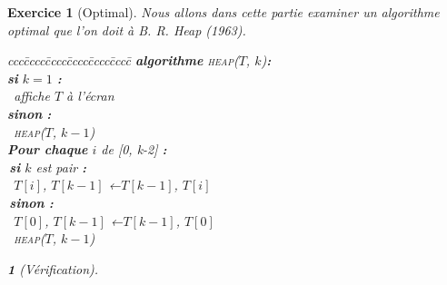 \documentclass{article}
\theoremstyle{exostyle}
\newtheorem{exo}{Exercice}
\theoremstyle{partiestyle}
\newtheorem{partie}{}[exo]
\theoremstyle{questionstyle}
\begin{document}
\begin{exo}[Optimal]
    Nous allons dans cette partie examiner un algorithme optimal que l'on doit à B. R. Heap (1963).
        \begin{tabbing}
            ccc\=cccc\=cccc\=cccc\=cccc\=cccc\=\kill
            \textbf{algorithme} \textsc{heap}($T$, $k$){\bf :}\\
            \>\textbf{si} $k = 1$ {\bf :}\\
            \> \>\vline $\,$ affiche $T$ à l'écran  \\
            \>\textbf{sinon} {\bf :}\\
            \> \>\vline $\,$ \textsc{heap}($T$, $k-1$)\\
            \> \textbf{Pour chaque} $i$ de [0, k-2] {\bf :}\\
            \> \>\vline $\,$\textbf{si} $k$ est pair {\bf :}\\
            \> \>\vline \>\vline $\,$ $T[i]$, $T[k-1]$ ←$T[k-1]$, $T[i]$\\
            \> \>\vline $\,$\textbf{sinon} {\bf :}\\
            \> \>\vline \>\vline $\,$ $T[0]$, $T[k-1]$ ←$T[k-1]$, $T[0]$\\
            \> \>\vline $\,$ \textsc{heap}($T$, $k-1$)\\
        \end{tabbing}

    \begin{partie}[Vérification]
        

\end{partie}
\end{exo}
\end{document}

